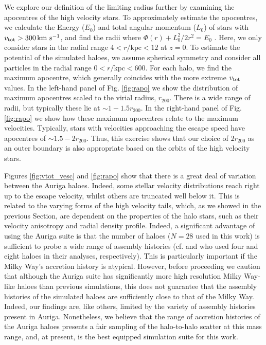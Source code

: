 \documentclass[fleqn,usenatbib]{mnras}
\newcommand{\kms}        {\,{\rm km}\,\,{\rm s}^{-1}}
\begin{document}
We explore our definition of the limiting radius further by examining the apocentres of the high velocity stars. To approximately estimate the apocentres, we calculate the Energy ($E_0$) and total angular momentum ($L_0$) of stars with $v_{\rm tot} > 300 \kms$, and find the radii where $\Phi(r) +L^2_0 / 2 r^2 = E_0$ \citep[see][chapter 3]{bt87}. Here, we only consider stars in the radial range $4 <  r/\mathrm{kpc} <12$ at $z=0$. To estimate the potential of the simulated haloes, we assume spherical symmetry and consider all particles in the radial range $0 < r/\mathrm{kpc} < 600$. For each halo, we find the maximum apocentre, which generally coincides with the more extreme $v_{\rm tot}$ values. In the left-hand panel of Fig. \ref{fig:rapo} we show the distribution of maximum apocentres scaled to the virial radius, $r_{200}$. There is a wide range of radii, but typically these lie at $\sim 1-1.5r_{200}$.  In the right-hand panel of Fig. \ref{fig:rapo} we show how these maximum apocentres relate to the maximum velocities. Typically, stars with velocities approaching the escape speed have apocentres of $\sim 1.5-2 r_{200}$. Thus, this exercise shows that our choice of $2r_{200}$ as an outer boundary is also appropriate based on the orbits of the high velocity stars.

Figures \ref{fig:vtot_vesc} and \ref{fig:rapo} show that there is a great deal of variation between the Auriga haloes. Indeed, some stellar velocity distributions reach right up to the escape velocity, whilst others are truncated well below it. This is related to the varying forms of the high velocity tails, which, as we showed in the previous Section, are dependent on the properties of the halo stars, such as their velocity anisotropy and radial density profile. Indeed, a significant advantage of using the Auriga suite is that the number of haloes ($N=28$ used in this work) is sufficient to probe a wide range of assembly histories (cf. \citealt{smith07} and \citealt{piffl14} who used four and eight haloes in their analyses, respectively). This is particularly important if the Milky Way's accretion history is atypical. However, before proceeding we caution that although the Auriga suite has significantly more high resolution Milky Way-like haloes than previous simulations, this does not guarantee that the assembly histories of the simulated haloes are sufficiently close to that of the Milky Way. Indeed, our findings are, like others, limited by the variety of assembly histories present in Auriga. Nonetheless, we believe that the range of accretion histories of the Auriga haloes presents a fair sampling of the halo-to-halo scatter at this mass range, and, at present, is the best equipped simulation suite for this work.
\end{document}
